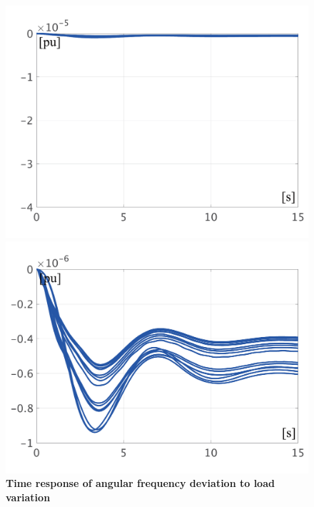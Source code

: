 \documentclass[graybox, envcountchap]{svmult}
\begin{document}
\begin{figure}[t]
{\begin{minipage}{0.49\linewidth}
    \centering
    \includegraphics[width = 1.0\linewidth]{figs/WavrWagc}
    \medskip
  \end{minipage}
  \begin{minipage}{0.49\linewidth}
    \centering
    \includegraphics[width = 1.0\linewidth]{figs/WavrWagcL}
    \medskip
  \end{minipage}
  }
  \medskip
  \caption{\textbf{Time response of angular frequency deviation to load variation}}
  \label{fig:omegasAGC}
\medskip
\end{figure}
\end{document}
